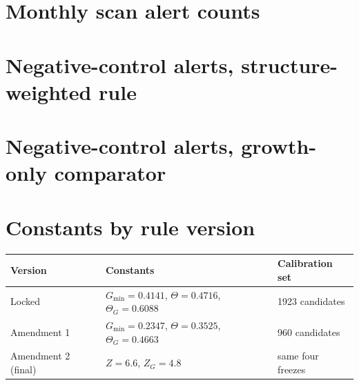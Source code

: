 \documentclass[11pt]{article}
\newcommand{\toprule}{\hline}\newcommand{\midrule}{\hline}\newcommand{\bottomrule}{\hline}
\begin{document}
\appendix
\section{Monthly scan alert counts}\label{app:scan}
{\small}
\section{Negative-control alerts, structure-weighted rule}
{\footnotesize}
\section{Negative-control alerts, growth-only comparator}
{\footnotesize}
\section{Constants by rule version}
\begin{table}[h]\centering\small
\begin{tabular}{lll}\toprule
Version & Constants & Calibration set\\\midrule
Locked & $G_{\min}=0.4141$, $\Theta=0.4716$, $\Theta_G=0.6088$ & 1923 candidates\\
Amendment 1 & $G_{\min}=0.2347$, $\Theta=0.3525$, $\Theta_G=0.4663$ & 960 candidates\\
Amendment 2 (final) & $Z=6.6$, $Z_G=4.8$ & same four freezes\\\bottomrule
\end{tabular}\end{table}
\end{document}
